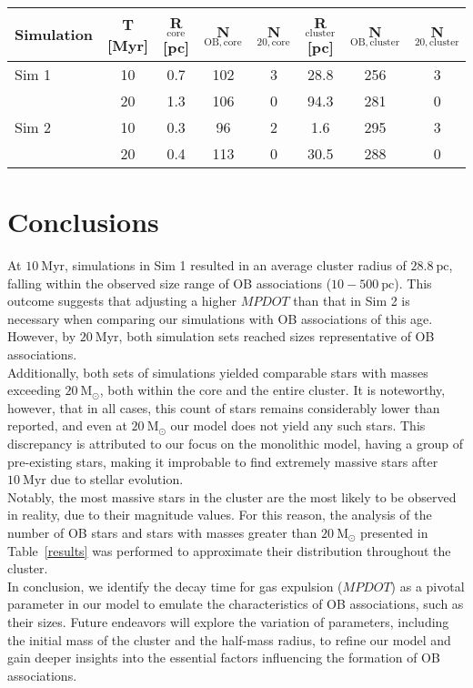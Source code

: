 \documentclass[baaa]{baaa}
\begin{document}
\begin{table*}[!t]
\centering
\caption{Simulation results.}
\begin{tabular}{lccccccc}
\hline\hline\noalign{\smallskip}
\!\!Simulation & \!\!\!\! T [Myr] & \!\!\! R$_{\mathrm{core}}$ [pc] & \!\!\!\! N$_\mathrm{OB,core}$ & \!\!\!\! N$_\mathrm{20,core}$ & \!\!\! R$_\mathrm{cluster}$ [pc] & \!\!\!\! N$_\mathrm{OB,cluster}$ &\!\!\!\! N$_\mathrm{20,cluster}$\\
\hline\noalign{\smallskip}
\!\!Sim 1 & 10 & 0.7 & 102 & 3 & 28.8 & 256 & 3\\
\!\!    & 20 & 1.3 & 106 & 0 & 94.3 & 281 & 0\\
\!\!Sim 2 & 10 & 0.3 & 96 & 2 & 1.6 & 295 & 3\\
\!\!      & 20 & 0.4 & 113 & 0 & 30.5 & 288 & 0\\
\hline
\end{tabular}
\label{results}
\end{table*}

\section{Conclusions} \label{Conclusions}
At $10~\mathrm{Myr}$, simulations in Sim 1 resulted in an average {cluster radius} of {$28.8~\mathrm{pc}$}, falling within the observed size range of OB associations ($10-500~\mathrm{pc}$). This outcome suggests that adjusting a higher $MPDOT$ than that in Sim 2 is necessary when comparing our simulations with OB associations of this age. However, by $20~\mathrm{Myr}$, both simulation sets reached sizes representative of OB associations.\\
Additionally, both sets of simulations yielded comparable stars with masses exceeding $20~\mathrm{M_\odot}$, both within the core and the entire cluster. It is noteworthy, however, that in all cases, this count of stars remains considerably lower than \cite{M&D_2020} reported, {and even at $20~\mathrm{M_\odot}$ our model does not yield any such stars.} This discrepancy is attributed to our focus on {the monolithic model, having} a group of pre-existing stars, making it improbable to find extremely massive stars after $10~\mathrm{Myr}$ due to stellar evolution.\\
{Notably, the most massive stars in the cluster are the most likely to be observed in reality, due to their magnitude values. For this reason, the analysis of the number of OB stars and stars with masses greater than $20~\mathrm{M_\odot}$ presented in Table~\ref{results} was performed to approximate their distribution throughout the cluster.}\\
In conclusion, we identify the decay time for gas expulsion ($MPDOT$) as a pivotal parameter in our model to emulate the characteristics of OB associations, such as their sizes. Future endeavors will explore the variation of parameters, including the initial mass of the cluster and the half-mass radius, to refine our model and gain deeper insights into the essential factors influencing the formation of OB associations.
\end{document}
